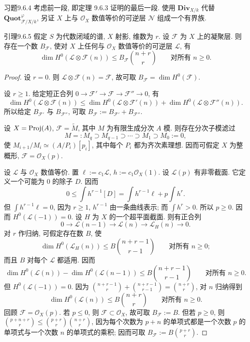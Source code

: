 \begin{origstatement}{习题}{9.6.4}\label{ch09s6:ex964}
考虑前一段, 即定理 9.6.3 证明的最后一段. 使用 $\mathbf{Div}_{X/k}$ 代替 $\mathbf{Quot}^{\varphi}_{\mathcal F/X/k}$, 另证 $X$ 上与 $\mathcal O_X$ 数值等价的可逆层 $\mathcal N$ 组成一个有界族.
\end{origstatement}

\begin{origstatement}{引理}{9.6.5}\label{ch09s6:lem965}
假定 $S$ 为代数闭域的谱, $X$ 射影, 维数为 $r$. 设 $\mathcal F$ 为 $X$ 上的凝聚层. 则存在一个数 $B_{\mathcal F}$, 使对 $X$ 上任何与 $\mathcal O_X$ 数值等价的可逆层 $\mathcal L$, 有
\[\dim H^0(\mathcal L\otimes\mathcal F(n))\leq B_{\mathcal F}\binom{n+r}{r}\qquad\text{对所有 $n\geq0$}.\]
\end{origstatement}
\begin{proof}
设 $r=0$. 则 $\mathcal L\otimes\mathcal F(n)=\mathcal F$, 故可取 $B_{\mathcal F}=\dim H^0(\mathcal F)$.

设 $r\geq1$. 给定短正合列 $0\to\mathcal F'\to\mathcal F\to\mathcal F''\to0$, 有
\[\dim H^0(\mathcal L\otimes\mathcal F(n))\leq\dim H^0(\mathcal L\otimes\mathcal F'(n))+\dim H^0(\mathcal L\otimes\mathcal F''(n)).\]
所以给定 $B_{\mathcal F'}$ 与 $B_{\mathcal F''}$, 可取 $B_{\mathcal F}:=B_{\mathcal F'}+B_{\mathcal F''}$.

设 $X=\operatorname{Proj}(A)$, $\mathcal F=\widetilde M$, 其中 $M$ 为有限生成分次 $A$ 模. 则存在分次子模滤过
\[M=:M_q\supset M_{q-1}\supset\cdots\supset M_1\supset M_0:=0,\]
使 $M_{i+1}/M_i\simeq(A/P_i)[p_i]$, 其中每个 $P_i$ 都为齐次素理想. 因而可假定 $X$ 为整概形, $\mathcal F=\mathcal O_X(p)$.

设 $\mathcal L$ 与 $\mathcal O_X$ 数值等价. 置 $\ell:=c_1\mathcal L$, $h:=c_1\mathcal O_X(1)$. 设 $\mathcal L(p)$ 有非零截面. 它定义一个可能为 $0$ 的除子 $D$. 因而
\[0\leq\int h^{r-1}[D]=\int h^{r-1}\ell+p\int h^r.\]
但 $\int h^{r-1}\ell=0$, 因为 $r\geq1$, $h^{r-1}$ 由一条曲线表示; 而 $\int h^r>0$. 所以 $p\geq0$. 因而 $H^0(\mathcal L(-1))=0$.
设 $H$ 为 $X$ 的一个超平面截面. 则有正合列
\[0\longrightarrow\mathcal L(n-1)\longrightarrow\mathcal L(n)\longrightarrow\mathcal L_H(n)\longrightarrow0.\]
对 $r$ 作归纳, 可假定存在数 $B$, 使
\[\dim H^0(\mathcal L_H(n))\leq B\binom{n+r-1}{r-1}\qquad\text{对所有 $n\geq0$};\]
而且 $B$ 对每个 $\mathcal L$ 都适用. 因而
\[\dim H^0(\mathcal L(n))-\dim H^0(\mathcal L(n-1))\leq B\binom{n+r-1}{r-1}\qquad\text{对所有 $n\geq0$}.\]
但 $H^0(\mathcal L(-1))=0$. 因为 $\binom{n+r-1}{r}+\binom{n+r-1}{r-1}=\binom{n+r}{r}$, 对 $n$ 归纳得到
\[\dim H^0(\mathcal L(n))\leq B\binom{n+r}{r}\qquad\text{对所有 $n\geq0$}.\]
回顾 $\mathcal F=\mathcal O_X(p)$. 若 $p\leq0$, 则 $\mathcal F\subset\mathcal O_X$, 故可取 $B_{\mathcal F}:=B$. 但若 $p\geq0$, 则 $\binom{p+n+r}{r}\leq\binom{p+r}{r}\binom{n+r}{r}$, 因为每个次数为 $p+n$ 的单项式都是一个次数 $p$ 的单项式与一个次数 $n$ 的单项式的乘积; 因而可取 $B_{\mathcal F}:=B\binom{p+r}{r}$.
\end{proof}

